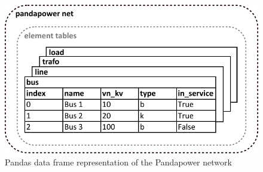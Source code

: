 \begin{figure}[H]
\centering
    \includegraphics[width=.6\linewidth]{images/Background/Pandapower/Pandapower_net.pdf}
\caption[Pandapower data frame]{Pandas data frame representation of the Pandapower network}
\end{figure}




